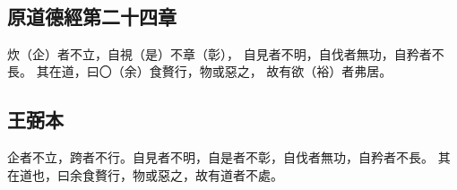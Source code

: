 ﻿%
%

\chapter{~}

\section{原道德經第二十四章}

\begin{withgezhu}

\zhsong


炊（\textcolor{tongjia-color}{企}）者不立，自視（\textcolor{tongjia-color}{是}）不章（\textcolor{tongjia-color}{彰}），
\colorbox{adding-color}{自}見者不明，自伐者無功，自矜者不長。
其在道，曰〇（\textcolor{tongjia-color}{余}）食贅行，物或惡之，
故有欲（\textcolor{tongjia-color}{裕}）者\colorbox{adding-color}{弗}居。

\end{withgezhu}

\section{王弼本}

\begin{withgezhu}

\zhsong

企者不立，跨者不行。自見者不明，自是者不彰，自伐者無功，自矜者不長。
其在道也，曰余食贅行，物或惡之，故有道者不處。

\end{withgezhu}
